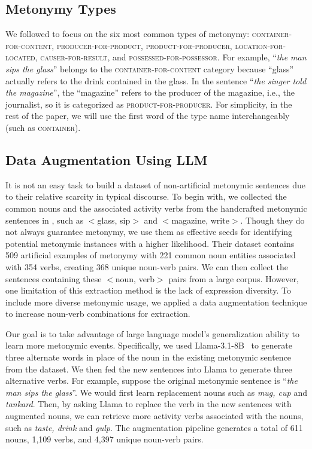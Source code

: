 \documentclass[11pt]{article}
\newcommand\z{\allowbreak\hspace{0pt}}
\begin{document}
\subsection{Metonymy Types}
We followed \citet{pedinotti-lenci-2020-dont} to focus on the six most common types of metonymy: \textsc{container}-\z\textsc{for}-\z\textsc{content}, \textsc{producer}-\z\textsc{for}-\z\textsc{product}, \textsc{product}-\z\textsc{for}-\z\textsc{producer}, \textsc{location}-\z\textsc{for}-\z\textsc{located}, \textsc{causer}-\z\textsc{for}-\z\textsc{result}, and \textsc{possessed}-\z\textsc{for}-\z\textsc{possessor}. For example, ``\textit{the man sips the glass}'' belongs to the \textsc{container-\z for-\z content} category because ``glass'' actually refers to the drink contained in the glass. In the sentence ``\textit{the singer told the magazine}'', the ``magazine'' refers to the producer of the magazine, i.e., the journalist, so it is categorized as \textsc{product-\z for-\z producer}. For simplicity, in the rest of the paper, we will use the first word of the type name interchangeably (such as \textsc{container}).

\subsection{Data Augmentation Using LLM}
It is not an easy task to build a dataset of non-artificial metonymic sentences due to their relative scarcity in typical discourse. To begin with, we collected the common nouns and the associated activity verbs from the handcrafted metonymic sentences in \citet{pedinotti-lenci-2020-dont}, such as $<$glass, sip$>$ and $<$magazine, write$>$. Though they do not always guarantee metonymy, we use them as effective seeds for identifying potential metonymic instances with a higher likelihood. Their dataset contains 509 artificial examples of metonymy with 221 common noun entities associated with 354 verbs, creating 368 unique noun-verb pairs. We can then collect the sentences containing these $<$noun, verb$>$ pairs from a large corpus. However, one limitation of this extraction method is the lack of expression diversity. To include more diverse metonymic usage, we applied a data augmentation technique to increase noun-verb combinations for extraction.

Our goal is to take advantage of large language model's generalization ability to learn more metonymic events. Specifically, we used Llama-3.1-8B~\citep{llama3.1} to generate three alternate words in place of the noun in the existing metonymic sentence from the \citet{pedinotti-lenci-2020-dont} dataset. We then fed the new sentences into Llama to generate three alternative verbs. For example, suppose the original metonymic sentence is  ``\textit{the man sips the glass}''. We would first learn replacement nouns such as \textit{mug, cup} and \textit{tankard}. Then, by asking Llama to replace the verb in the new sentences with augmented nouns, we can retrieve more activity verbs associated with the nouns, such as \textit{taste, drink} and \textit{gulp}. The augmentation pipeline generates a total of 611 nouns, 1,109 verbs, and 4,397 unique noun-verb pairs. 
\end{document}
